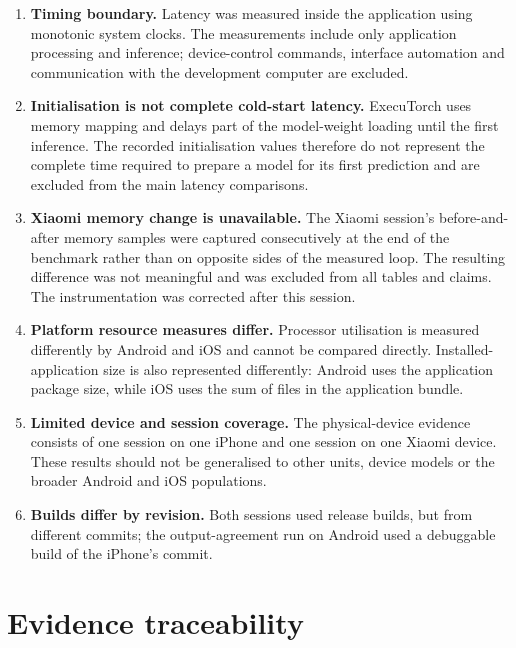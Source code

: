 \documentclass[preprint,12pt,authoryear]{elsarticle}
\begin{document}
\begin{enumerate}
  \item \textbf{Timing boundary.} Latency was measured inside the application
  using monotonic system clocks. The measurements include only application
  processing and inference; device-control commands, interface automation and
  communication with the development computer are excluded.

  \item \textbf{Initialisation is not complete cold-start latency.}
  ExecuTorch uses memory mapping and delays part of the model-weight loading
  until the first inference. The recorded initialisation values therefore do
  not represent the complete time required to prepare a model for its first
  prediction and are excluded from the main latency comparisons.

  \item \textbf{Xiaomi memory change is unavailable.} The Xiaomi session's
  before-and-after memory samples were captured consecutively at the end of
  the benchmark rather than on opposite sides of the measured loop. The
  resulting difference was not meaningful and was excluded from all tables
  and claims. The instrumentation was corrected after this session.

  \item \textbf{Platform resource measures differ.} Processor utilisation is
  measured differently by Android and iOS and cannot be compared directly.
  Installed-application size is also represented differently: Android uses
  the application package size, while iOS uses the sum of files in the
  application bundle.

  \item \textbf{Limited device and session coverage.} The physical-device
  evidence consists of one session on one iPhone and one session on one
  Xiaomi device. These results should not be generalised to other units,
  device models or the broader Android and iOS populations.

  \item \textbf{Builds differ by revision.} Both sessions used release builds,
  but from different commits; the output-agreement run on Android used a
  debuggable build of the iPhone's commit.
\end{enumerate}

\section{Evidence traceability}
\label{sup:mapping}
\end{document}
